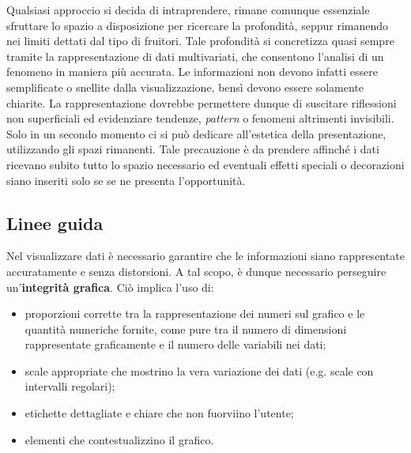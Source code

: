 Qualsiasi approccio si decida di intraprendere, rimane comunque essenziale sfruttare lo spazio a disposizione per ricercare la profondità, seppur rimanendo nei limiti dettati dal tipo di fruitori.
Tale profondità si concretizza quasi sempre tramite la rappresentazione di dati multivariati, che consentono l'analisi di un fenomeno in maniera più accurata. %
Le informazioni non devono infatti essere semplificate o snellite dalla visualizzazione, bensì devono essere solamente chiarite. La rappresentazione dovrebbe permettere dunque di suscitare riflessioni non superficiali ed evidenziare tendenze, \emph{pattern} 
o fenomeni altrimenti invisibili. 
Solo in un secondo momento ci si può dedicare all'estetica della presentazione, utilizzando gli spazi rimanenti. Tale precauzione è da prendere affinché i dati ricevano subito tutto lo spazio necessario ed eventuali
effetti speciali o decorazioni siano inseriti solo se se ne presenta l'opportunità.


\subsection{Linee guida}
Nel visualizzare dati è necessario garantire che le informazioni siano rappresentate accuratamente e senza distorsioni.
A tal scopo, è dunque necessario perseguire un'\textbf{integrità grafica}. Ciò implica l'uso di:
\begin{itemize}
    \item proporzioni corrette tra la rappresentazione dei numeri sul grafico e le quantità numeriche fornite, come pure tra il 
    numero di dimensioni rappresentate graficamente e il numero delle variabili nei dati;
    \item scale appropriate che mostrino la vera variazione dei dati (e.g. scale con intervalli regolari);
    \item etichette dettagliate e chiare che non fuorviino l'utente;
    \item elementi che contestualizzino il grafico.
\end{itemize}

